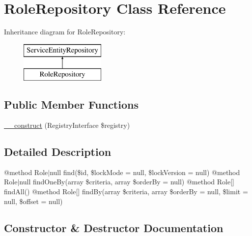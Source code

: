 \hypertarget{class_app_1_1_repository_1_1_role_repository}{}\section{Role\+Repository Class Reference}
\label{class_app_1_1_repository_1_1_role_repository}
Inheritance diagram for Role\+Repository\+:\begin{figure}[H]
\begin{center}
\leavevmode
\includegraphics[height=2.000000cm]{class_app_1_1_repository_1_1_role_repository}
\end{center}
\end{figure}
\subsection*{Public Member Functions}
\begin{DoxyCompactItemize}
\item 
\mbox{\hyperlink{class_app_1_1_repository_1_1_role_repository_aadca7edd263e228921a1860bb6b9c252}{\+\_\+\+\_\+construct}} (Registry\+Interface \$registry)
\end{DoxyCompactItemize}


\subsection{Detailed Description}
@method Role$\vert$null find(\$id, \$lock\+Mode = null, \$lock\+Version = null) @method Role$\vert$null find\+One\+By(array \$criteria, array \$order\+By = null) @method Role\mbox{[}\mbox{]} find\+All() @method Role\mbox{[}\mbox{]} find\+By(array \$criteria, array \$order\+By = null, \$limit = null, \$offset = null) 

\subsection{Constructor \& Destructor Documentation}
\mbox{\label{class_app_1_1_repository_1_1_role_repository_aadca7edd263e228921a1860bb6b9c252}} 
